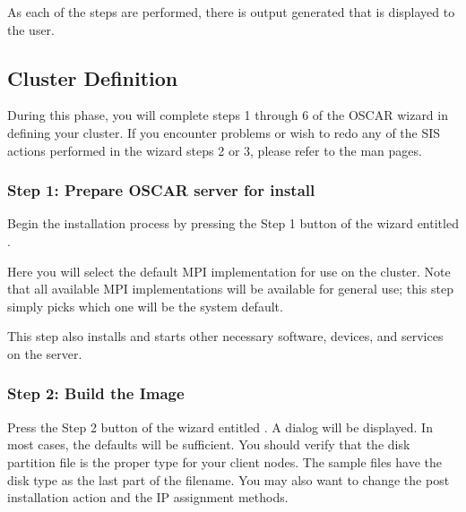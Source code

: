 As each of the steps are performed, there is output generated that is
displayed to the user. 


\subsection{Cluster Definition}
\label{sec:detailed-cluster-def}

During this phase, you will complete steps 1 through 6 of the OSCAR
wizard in defining your cluster.  If you encounter problems or wish to
redo any of the SIS actions performed in the wizard steps 2 or 3,
please refer to the  man pages.


\subsubsection{Step 1: Prepare OSCAR server for install} 
\label{det:prepareforinstall}

Begin the installation process by pressing the Step 1 button of the
wizard entitled . 

Here you will select the default MPI implementation for use on the
cluster.  Note that all available MPI implementations will be
available for general use; this step simply picks which one will be
the system default.

This step also installs and starts other necessary software, devices,
and services on the server.


\subsubsection{Step 2: Build the Image} 
\label{det:buildimage}

Press the Step 2 button of the wizard entitled . A dialog will be displayed. In most cases, the
defaults will be sufficient. You should verify that the disk partition
file is the proper type for your client nodes. The sample files have
the disk type as the last part of the filename. You may also want to
change the post installation action and the IP assignment methods.

